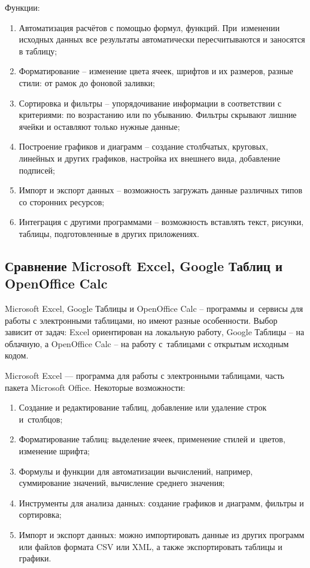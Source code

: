 \documentclass{ou}
\begin{document}
Функции:
\begin{enumerate}[leftmargin=0em, itemindent=3.75em, nosep, label=\arabic*)]
\item Автоматизация расчётов с помощью формул, функций. При~изменении исходных данных все результаты автоматически пересчитываются и заносятся в таблицу;
\item Форматирование -- изменение цвета ячеек, шрифтов и их размеров, разные стили: от рамок до фоновой заливки;
\item Сортировка и фильтры -- упорядочивание информации в соответствии с критериями: по возрастанию или по убыванию. Фильтры скрывают лишние ячейки и оставляют только нужные данные;
\item Построение графиков и диаграмм -- создание столбчатых, круговых, линейных и других графиков, настройка их внешнего вида, добавление подписей;
\item Импорт и экспорт данных -- возможность загружать данные различных типов со сторонних ресурсов;
\item Интеграция с другими программами -- возможность вставлять текст, рисунки, таблицы, подготовленные в других приложениях. 
\end{enumerate}
\subsection{Сравнение Microsoft Excel, Google Таблиц и OpenOffice Calc}

Microsoft Excel, Google Таблицы и OpenOffice Calc -- программы и~сервисы для работы с электронными таблицами, но имеют разные особенности. Выбор зависит от задач: Excel ориентирован на локальную работу, Google Таблицы -- на облачную, а OpenOffice Calc -- на работу с~таблицами с открытым исходным кодом.  

Microsoft Excel --- программа для работы с электронными таблицами, часть пакета Microsoft Office. Некоторые возможности:  
\begin{enumerate}[leftmargin=0em, itemindent=3.75em, nosep, label=\arabic*)]
\item Создание и редактирование таблиц, добавление или удаление строк и~столбцов;
\item Форматирование таблиц: выделение ячеек, применение стилей и~цветов, изменение шрифта;
\item Формулы и функции для автоматизации вычислений, например, суммирование значений, вычисление среднего значения;
\item Инструменты для анализа данных: создание графиков и диаграмм, фильтры и сортировка;
\item Импорт и экспорт данных: можно импортировать данные из других программ или файлов формата CSV или XML, а также экспортировать таблицы и графики.
\end{enumerate}
\end{document}
